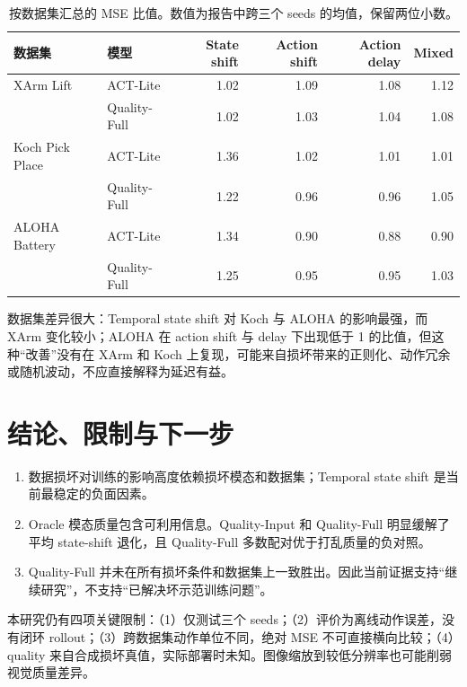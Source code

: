 \documentclass[11pt,a4paper]{ctexart}
\begin{document}
\begin{table}[htbp]
\centering
\small
\begin{tabularx}{\linewidth}{Y lrrrr}
\toprule
数据集 & 模型 & State shift & Action shift & Action delay & Mixed\\
\midrule
XArm Lift & ACT-Lite & 1.02 & 1.09 & 1.08 & 1.12\\
 & Quality-Full & 1.02 & 1.03 & 1.04 & 1.08\\
Koch Pick Place & ACT-Lite & 1.36 & 1.02 & 1.01 & 1.01\\
 & Quality-Full & 1.22 & 0.96 & 0.96 & 1.05\\
ALOHA Battery & ACT-Lite & 1.34 & 0.90 & 0.88 & 0.90\\
 & Quality-Full & 1.25 & 0.95 & 0.95 & 1.03\\
\bottomrule
\end{tabularx}
\caption{按数据集汇总的 MSE 比值。数值为报告中跨三个 seeds 的均值，保留两位小数。}
\end{table}

数据集差异很大：Temporal state shift 对 Koch 与 ALOHA 的影响最强，而 XArm 变化较小；ALOHA 在 action shift 与 delay 下出现低于 1 的比值，但这种“改善”没有在 XArm 和 Koch 上复现，可能来自损坏带来的正则化、动作冗余或随机波动，不应直接解释为延迟有益。

\section{结论、限制与下一步}

\begin{tcolorbox}[colback=panel,colframe=teal,boxrule=0.8pt,arc=1.5mm,title={\color{navy}\bfseries 主要结论}]
\begin{enumerate}
\item 数据损坏对训练的影响高度依赖损坏模态和数据集；Temporal state shift 是当前最稳定的负面因素。
\item Oracle 模态质量包含可利用信息。Quality-Input 和 Quality-Full 明显缓解了平均 state-shift 退化，且 Quality-Full 多数配对优于打乱质量的负对照。
\item Quality-Full 并未在所有损坏条件和数据集上一致胜出。因此当前证据支持“继续研究”，不支持“已解决坏示范训练问题”。
\end{enumerate}
\end{tcolorbox}

本研究仍有四项关键限制：（1）仅测试三个 seeds；（2）评价为离线动作误差，没有闭环 rollout；（3）跨数据集动作单位不同，绝对 MSE 不可直接横向比较；（4）quality 来自合成损坏真值，实际部署时未知。图像缩放到较低分辨率也可能削弱视觉质量差异。
\end{document}
